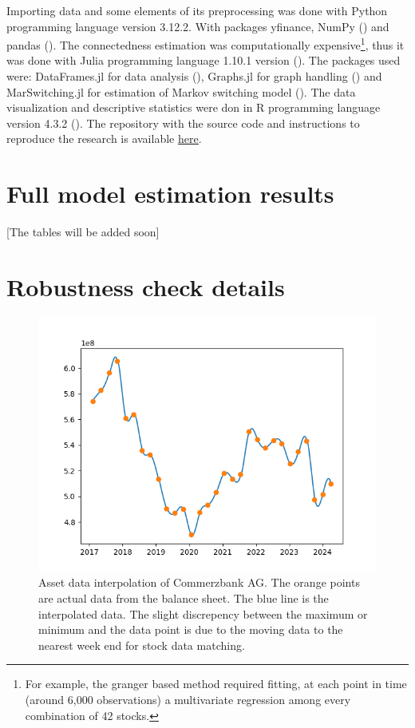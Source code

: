 \documentclass[12pt]{article}
\begin{document}
Importing data and some elements of its preprocessing was done with Python programming language version 3.12.2. With packages yfinance, NumPy (\citet{harris20}) and pandas (\citet{reback20}). The connectedness estimation was computationally expensive\footnote{For example, the granger based method required fitting, at each point in time (around 6,000 observations) a multivariate regression among every combination of 42 stocks.}, thus it was done with Julia programming language 1.10.1 version (\citet{bezanson17}). The packages used were: DataFrames.jl for data analysis (\citet{kaminski23}), Graphs.jl for graph handling (\citet{fairbanks21}) and MarSwitching.jl for estimation of Markov switching model (\citet{dadej24}). The data visualization and descriptive statistics were don in R programming language version 4.3.2 (\citet{rcore23}). The repository with the source code and instructions to reproduce the research is available \href{https://github.com/m-dadej/robust\_fragile}{\underline{here}}.

\section{Full model estimation results}\label{appendix:model_params}
[The tables will be added soon]
\section{Robustness check details}\label{appendix:robustness}

\begin{figure}[!htbp]
	\centering
	\includegraphics[scale = 0.8]{img/interpolation.png}
	\caption{Asset data interpolation of Commerzbank AG. The orange points are actual data from the balance sheet. The blue line is the interpolated data. The slight discrepency between the maximum or minimum and the data point is due to the moving data to the nearest week end for stock data matching.}
	\label{figure:interpolation}
\end{figure}
\end{document}

